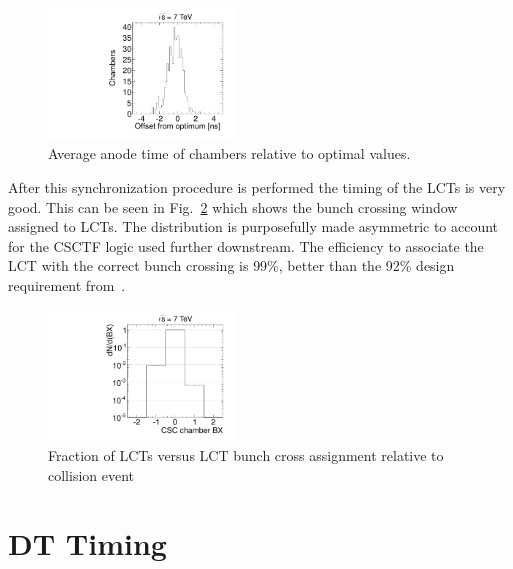 \begin{figure}
  \begin{center}
      \includegraphics[clip=true, trim=0.0cm 0cm 0.0cm 0cm, width=0.44\textwidth]{figures/timing/average_anodes}
      \caption[Average anode time of chambers relative to optimal values.]
      {Average anode time of chambers relative to optimal values.
        }
      \label{fig:average_anodes}
  \end{center}
\end{figure}

After this synchronization procedure is performed the timing of the LCTs is very good. This can be seen in Fig.~\ref{fig:ALCTBX} which shows the bunch crossing window
assigned to LCTs. The distribution is purposefully made asymmetric to account for the CSCTF logic used further downstream.
The efficiency to associate the LCT with the correct bunch crossing is 99\%, better than the 92\% design requirement from~\cite{Chatrchyan:2008zzk}.

\begin{figure}
  \begin{center}
      \includegraphics[clip=true, width=0.44\textwidth]{figures/timing/ALCT_Bx}
      \caption[Fraction of LCTs versus LCT bunch crossing window assignment.]
      {Fraction of LCTs versus LCT bunch cross assignment relative to collision event
        }
      \label{fig:ALCTBX}
  \end{center}
\end{figure}

\section{DT Timing}

